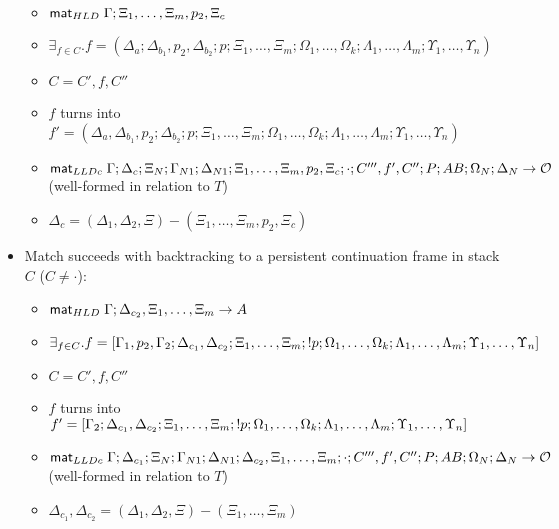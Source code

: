 \begin{lemma}
\begin{itemize}[leftmargin=*]
      \begin{itemize}[leftmargin=\secondm]
         \item $\mathsf{mat}_{HLD} \; \Gamma; \Xi_1, \dotsc, \Xi_m, p_2, \Xi_c$
         \item $\exists_{f \in C}. f = (\Delta_a; \Delta_{b_1}, p_2,
               \Delta_{b_2}; p; \Xi_1, \dotsc, \Xi_m; \Omega_1, \dotsc,
               \Omega_k; \Lambda_1, \dotsc, \Lambda_m; \Upsilon_1, \dotsc,
               \Upsilon_n)$
         \item $C = C', f, C''$
         \item $f$ turns into $f' = (\Delta_a, \Delta_{b_1}, p_2;
               \Delta_{b_2}; p; \Xi_1, \dotsc, \Xi_m;
               \Omega_1, \dotsc, \Omega_k; \Lambda_1, \dotsc, \Lambda_m;
               \Upsilon_1, \dotsc, \Upsilon_n)$
         \item $\mathsf{mat}_{LLDc} \; \Gamma; \Delta_c; \Xi_N; \Gamma_{N1}; \Delta_{N1}; \Xi_1,
            \dotsc, \Xi_m, p_2, \Xi_c; \cdot; C''', f', C''; P;
            AB; \Omega_N; \Delta_N \rightarrow \mathcal{O}$ (well-formed in relation to $T$)
         \item $\Delta_c = (\Delta_1, \Delta_2, \Xi) - (\Xi_1, \dotsc, \Xi_m,
               p_2, \Xi_c)$
      \end{itemize}

      \item Match succeeds with backtracking to a persistent continuation frame
      in stack $C$ ($C \neq \cdot$):
      \begin{itemize}[leftmargin=\secondm]
         \item $\mathsf{mat}_{HLD} \; \Gamma; \Delta_{c_2}, \Xi_1, \dotsc, \Xi_m \rightarrow A$
         \item $\exists_{f \in C}. f = [\Gamma_1, p_2, \Gamma_2; \Delta_{c_1},
            \Delta_{c_2}; \Xi_1, \dotsc, \Xi_m; {!} p; \Omega_1, \dotsc, \Omega_k;
            \Lambda_1, \dotsc, \Lambda_m; \Upsilon_1, \dotsc, \Upsilon_n]$
         \item $C = C', f, C''$
         \item $f$ turns into $f' = [\Gamma_2; \Delta_{c_1}, \Delta_{c_2};
            \Xi_1, \dotsc, \Xi_m; {!} p; \Omega_1, \dotsc, \Omega_k; \Lambda_1,
            \dotsc, \Lambda_m; \Upsilon_1, \dotsc, \Upsilon_n]$
         \item $\mathsf{mat}_{LLDc} \; \Gamma; \Delta_{c_1}; \Xi_N; \Gamma_{N1}; \Delta_{N1};
            \Delta_{c_2}, \Xi_1, \dotsc, \Xi_m; \cdot; C''', f', C''; P;
            AB; \Omega_N; \Delta_N \rightarrow \mathcal{O}$ (well-formed in relation to $T$)
         \item $\Delta_{c_1}, \Delta_{c_2} = (\Delta_1, \Delta_2, \Xi) - (\Xi_1, \dotsc, \Xi_m)$
      \end{itemize}


\end{itemize}
\end{lemma}
